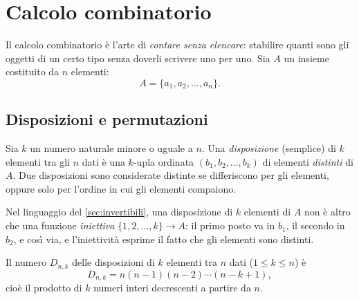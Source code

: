 \section{Calcolo combinatorio}
\label{sec:combinatoria}

Il calcolo combinatorio è l'arte di \emph{contare senza elencare}: stabilire quanti sono
gli oggetti di un certo tipo senza doverli scrivere uno per uno. Sia $A$ un insieme
costituito da $n$ elementi:
\begin{equation}\label{eq:insieme-n}
  A=\{a_{1},a_{2},\dots,a_{n}\}.
\end{equation}

\subsection{Disposizioni e permutazioni}

\begin{definizione}[Disposizione]
Sia $k$ un numero naturale minore o uguale a $n$. Una \emph{disposizione} (semplice) di
$k$ elementi tra gli $n$ dati è una $k$-upla ordinata $(b_{1},b_{2},\dots,b_{k})$ di
elementi \emph{distinti} di $A$. Due disposizioni sono considerate distinte se
differiscono per gli elementi, oppure solo per l'ordine in cui gli elementi compaiono.
\end{definizione}

Nel linguaggio del \cref{sec:invertibili}, una disposizione di $k$ elementi di $A$ non è
altro che una funzione \emph{iniettiva} $\{1,2,\dots,k\}\to A$: il primo posto va in
$b_{1}$, il secondo in $b_{2}$, e così via, e l'iniettività esprime il fatto che gli
elementi sono distinti.

\begin{teorema}\label{teo:disposizioni}
Il numero $D_{n,k}$ delle disposizioni di $k$ elementi tra $n$ dati ($1\le k\le n$) è
\begin{equation}\label{eq:disposizioni}
  D_{n,k}=n(n-1)(n-2)\cdots(n-k+1),
\end{equation}
cioè il prodotto di $k$ numeri interi decrescenti a partire da $n$.
\end{teorema}

\begin{schema}
\end{schema}


